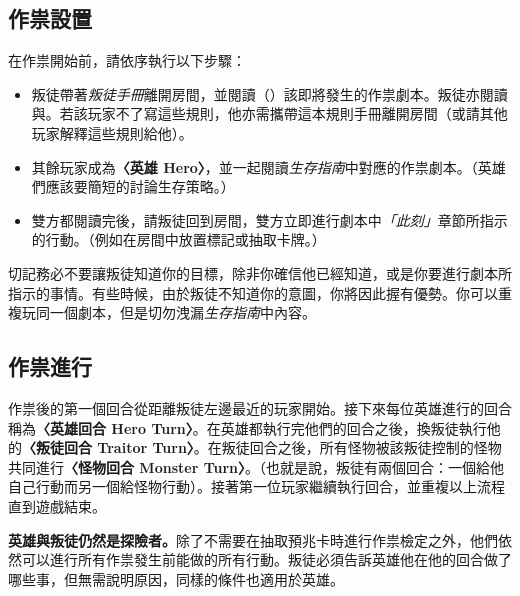
\subsection{作祟設置} \label{ssec:haunt-setup}

在作祟開始前，請依序執行以下步驟：

\begin{itemize}
  \item 叛徒帶著\emph{叛徒手冊}離開房間，並閱讀（）該即將發生的作祟劇本。叛徒亦閱讀與。若該玩家不了寫這些規則，他亦需攜帶這本規則手冊離開房間（或請其他玩家解釋這些規則給他）。
  \item 其餘玩家成為\textbf{〈英雄 Hero〉}，並一起閱讀\emph{生存指南}中對應的作祟劇本。（英雄們應該要簡短的討論生存策略。）
  \item 雙方都閱讀完後，請叛徒回到房間，雙方立即進行劇本中\emph{「此刻」}章節所指示的行動。（例如在房間中放置標記或抽取卡牌。）
\end{itemize}

\begin{RuleBox}{}
  切記務必不要讓叛徒知道你的目標，除非你確信他已經知道，或是你要進行劇本所指示的事情。有些時候，由於叛徒不知道你的意圖，你將因此握有優勢。你可以重複玩同一個劇本，但是切勿洩漏\emph{生存指南}中內容。
\end{RuleBox}


\subsection{作祟進行} \label{ssec:playing-the-hanut}

作祟後的第一個回合從距離叛徒左邊最近的玩家開始。接下來每位英雄進行的回合稱為\textbf{〈英雄回合 Hero Turn〉}。在英雄都執行完他們的回合之後，換叛徒執行他的\textbf{〈叛徒回合 Traitor Turn〉}。在叛徒回合之後，所有怪物被該叛徒控制的怪物共同進行\textbf{〈怪物回合 Monster Turn〉}。（也就是說，叛徒有兩個回合：一個給他自己行動而另一個給怪物行動）。接著第一位玩家繼續執行回合，並重複以上流程直到遊戲結束。

\textbf{英雄與叛徒仍然是探險者。}除了不需要在抽取預兆卡時進行作祟檢定之外，他們依然可以進行所有作祟發生前能做的所有行動。叛徒必須告訴英雄他在他的回合做了哪些事，但無需說明原因，同樣的條件也適用於英雄。

